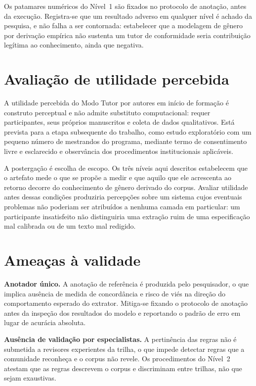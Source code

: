 Os patamares numéricos do Nível~1 são fixados no protocolo de anotação, antes da execução. Registra-se que um resultado adverso em qualquer nível é achado da pesquisa, e não falha a ser contornada: estabelecer que a modelagem de gênero por derivação empírica não sustenta um tutor de conformidade seria contribuição legítima ao conhecimento, ainda que negativa.


\section{Avaliação de utilidade percebida}
\label{sec:utilidade-futura}

A utilidade percebida do Modo Tutor por autores em início de formação é construto perceptual e não admite substituto computacional: requer participantes, seus próprios manuscritos e coleta de dados qualitativos. Está prevista para a etapa subsequente do trabalho, como estudo exploratório com um pequeno número de mestrandos do programa, mediante termo de consentimento livre e esclarecido e observância dos procedimentos institucionais aplicáveis.

A postergação é escolha de escopo. Os três níveis aqui descritos estabelecem que o artefato mede o que se propõe a medir e que aquilo que ele acrescenta ao retorno decorre do conhecimento de gênero derivado do corpus. Avaliar utilidade antes dessas condições produziria percepções sobre um sistema cujos eventuais problemas não poderiam ser atribuídos a nenhuma camada em particular: um participante insatisfeito não distinguiria uma extração ruim de uma especificação mal calibrada ou de um texto mal redigido.


\section{Ameaças à validade}
\label{sec:ameacas}

\textbf{Anotador único.} A anotação de referência é produzida pelo pesquisador, o que implica ausência de medida de concordância e risco de viés na direção do comportamento esperado do extrator. Mitiga-se fixando o protocolo de anotação antes da inspeção dos resultados do modelo e reportando o padrão de erro em lugar de acurácia absoluta.

\textbf{Ausência de validação por especialistas.} A pertinência das regras não é submetida a revisores experientes da trilha, o que impede detectar regras que a comunidade reconheça e o corpus não revele. Os procedimentos do Nível~2 atestam que as regras descrevem o corpus e discriminam entre trilhas, não que sejam exaustivas.

